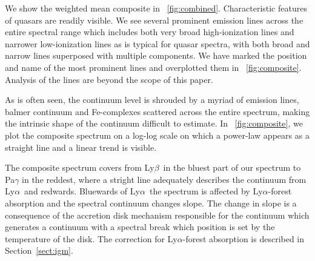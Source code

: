 \documentclass{aa}    %
\newcommand{\figref}[1]{\ref{fig:#1}}
\newcommand{\Fig}[1]{\figurename~\figref{#1}}
\newcommand{\fig}[1]{\Fig{#1}}
\newcommand{\figlabel}[1]{\label{fig:#1}}
\newcommand{\sectionname}{Section}
\newcommand{\Sect}[1]{\sectionname~\ref{sect:#1}}
\newcommand{\sect}[1]{\Sect{#1}}
\newcommand{\lya}{Ly$\alpha$}
\newcommand{\lyb}{Ly$\beta$}
\begin{document}
We show the weighted mean composite in \fig{combined}. Characteristic features of quasars are readily visible. We see several prominent emission lines across the entire spectral range which includes both very broad high-ionization lines and narrower low-ionization lines as is typical for quasar spectra, with both broad and narrow lines superposed with multiple components\citep{Baldwin1995}. We have marked the position and name of the most prominent lines and overplotted them in \fig{composite}.  Analysis of the lines are beyond the scope of this paper.



As is often seen\citep{Elvis2001}, the continuum level is shrouded by a myriad of emission lines, balmer continuum and Fe-complexes scattered across the entire spectrum, making the intrinsic shape of the continuum difficult to estimate. In \fig{composite}, we plot the composite spectrum on a log-log scale on which a power-law appears as a straight line and a linear trend is visible. 

The composite spectrum covers from \lyb ~in the bluest part of our spectrum to Pa$\gamma$ in the reddest, where a stright line adequately describes the continuum from \lya~and redwards. Bluewards of \lya~the spectrum is affected by \lya-forest absorption and the spectral continuum changes slope. The change in slope is a consequence of the accretion disk mechanism responsible for the continuum which generates a continuum with a spectral break which position is set by the temperature of the disk\citep{Pereyra2006}. The correction for \lya-forest absorption is described in \sect{igm}.
\end{document}
